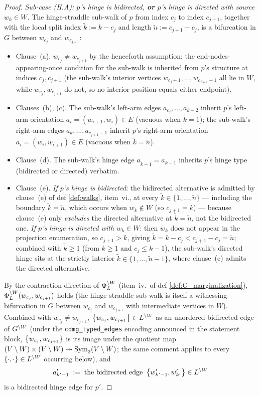 \documentclass[main]{subfiles}
\begin{document}
\begin{proof}
\emph{Sub-case (H.A): $p$'s hinge is bidirected, \textbf{or} $p$'s hinge
is directed with source $w_k \in W$.}
The hinge-straddle sub-walk of $p$ from index $c_j$ to index $c_{j+1}$,
together with the local split index $\tilde k := k - c_j$ and length
$\tilde n := c_{j+1} - c_j$, is a bifurcation in $G$ between $w_{c_j}$
and $w_{c_{j+1}}$:
\begin{itemize}
    \item Clause~(a). $w_{c_j} \ne w_{c_{j+1}}$ by the henceforth assumption; the end-nodes-appearing-once condition for the sub-walk is inherited from $p$'s structure at indices $c_j, c_{j+1}$ (the sub-walk's interior vertices $w_{c_j + 1}, \dots, w_{c_{j+1} - 1}$ all lie in $W$, while $w_{c_j}, w_{c_{j+1}}$ do not, so no interior position equals either endpoint).
    \item Clauses~(b), (c). The sub-walk's left-arm edges $a_{c_j}, \dots, a_{k - 2}$ inherit $p$'s left-arm orientation $a_i = (w_{i + 1}, w_i) \in E$ (vacuous when $\tilde k = 1$); the sub-walk's right-arm edges $a_k, \dots, a_{c_{j+1} - 1}$ inherit $p$'s right-arm orientation $a_i = (w_i, w_{i + 1}) \in E$ (vacuous when $\tilde k = \tilde n$).
    \item Clause~(d). The sub-walk's hinge edge $a_{\tilde k - 1} = a_{k - 1}$ inherits $p$'s hinge type (bidirected or directed) verbatim.
    \item Clause~(e). \emph{If $p$'s hinge is bidirected}: the bidirected alternative is admitted by clause~(e) of def \ref{def:walks}, item~vi., at every $\tilde k \in \{1, \dots, \tilde n\}$ --- including the boundary $\tilde k = \tilde n$, which occurs when $w_k \notin W$ (so $c_{j+1} = k$) --- because clause~(e) only \emph{excludes} the directed alternative at $\tilde k = \tilde n$, not the bidirected one. \emph{If $p$'s hinge is directed with $w_k \in W$}: then $w_k$ does not appear in the projection enumeration, so $c_{j+1} > k$, giving $\tilde k = k - c_j < c_{j+1} - c_j = \tilde n$; combined with $\tilde k \ge 1$ (from $k \ge 1$ and $c_j \le k - 1$), the sub-walk's directed hinge sits at the strictly interior $\tilde k \in \{1, \dots, \tilde n - 1\}$, where clause~(e) admits the directed alternative.
\end{itemize}
By the contraction direction of $\Phi_L^{\setminus W}$ (item~iv.\ of
def \ref{def:G_marginalization}), $\Phi_L^{\setminus W}(w_{c_j}, w_{c_{j+1}})$
holds (the hinge-straddle sub-walk is itself a witnessing bifurcation
in $G$ between $w_{c_j}$ and $w_{c_{j+1}}$ with intermediate vertices in
$W$). Combined with $w_{c_j} \ne w_{c_{j+1}}$,
$\left \{ w_{c_j}, w_{c_{j+1}} \right \} \in L^{\setminus W}$ as an unordered bidirected
edge of $G^{\setminus W}$ (under the \texttt{cdmg\_typed\_edges} encoding
announced in the statement block, $\left \{ w_{c_j}, w_{c_{j+1}} \right \}$ is its
image under the quotient map $(V \setminus W) \times (V \setminus W) \twoheadrightarrow
\text{Sym}_2(V \setminus W)$; the same comment applies to every
$\left \{ \cdot, \cdot \right \} \in L^{\setminus W}$ occurring below), and
\[
    a'_{k'-1} \;:=\; \text{the bidirected edge } \left \{ w'_{k'-1}, w'_{k'} \right \} \in L^{\setminus W}
\]
is a bidirected hinge edge for $p'$.


\end{proof}
\end{document}
